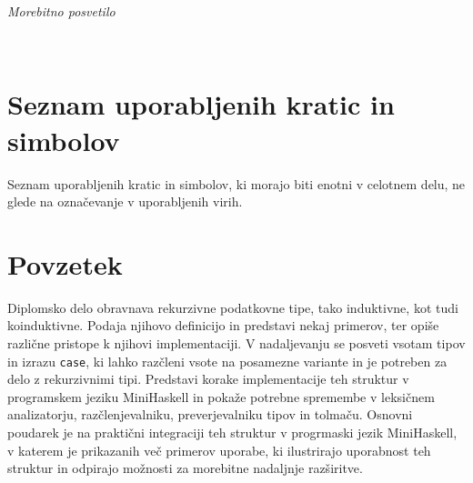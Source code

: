 \documentclass[12pt,a4paper,openany]{book}
\begin{document}
$\;$ 

\vspace{5cm}
\hfill {\Large \em Morebitno posvetilo}
\thispagestyle{empty}

\newpage



\ \thispagestyle{empty}

\newpage


\renewcommand\thepage{} 
\tableofcontents 
\renewcommand\thepage{\arabic{page}}

\thispagestyle{empty}



\chapter*{Seznam uporabljenih kratic in simbolov}

\thispagestyle{empty}

Seznam uporabljenih kratic in simbolov, ki morajo biti enotni v celotnem delu, ne glede na označevanje v uporabljenih virih.


\clearpage{\pagestyle{empty}\cleardoublepage}


\setcounter{page}{1}

\chapter*{Povzetek}

Diplomsko delo obravnava rekurzivne podatkovne tipe, tako induktivne, kot tudi koinduktivne. Podaja njihovo definicijo in predstavi nekaj 
primerov, ter opiše različne pristope k njihovi implementaciji. V nadaljevanju se posveti vsotam tipov in izrazu \lstinline{case}, ki lahko razčleni 
vsote na posamezne variante in je potreben za delo z rekurzivnimi tipi. Predstavi korake implementacije teh struktur v programskem jeziku 
MiniHaskell in pokaže potrebne spremembe v leksičnem analizatorju, razčlenjevalniku, preverjevalniku tipov in tolmaču. Osnovni poudarek je 
na praktični integraciji teh struktur v progrmaski jezik MiniHaskell, v katerem je prikazanih več primerov uporabe, ki ilustrirajo uporabnost 
teh struktur in odpirajo možnosti za morebitne nadaljnje razširitve.
\end{document}
